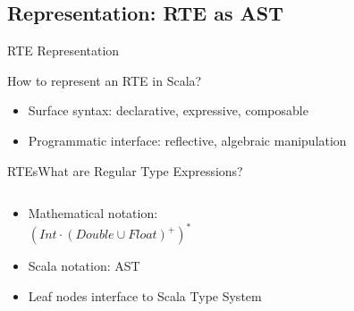 \subsection{Representation: RTE as AST}


{  
\begin{frame}{ RTE Representation}

  How to represent an RTE in Scala?


  \medskip
  
  \begin{itemize}
  \item Surface syntax: declarative, expressive, composable
  \item Programmatic interface: reflective, algebraic manipulation
  \end{itemize}
\end{frame}
}

\newsavebox\exnotebox
\begin{lrbox}{\exnotebox}
  \begin{minipage}{6.5cm}
    
  \end{minipage}
\end{lrbox}


\begin{frame}{RTEs}{What are Regular Type Expressions?}
  \begin{columns}
    \begin{column}{0.55\textwidth}
  \begin{itemize}
  \item Mathematical notation:\\
  \quad\textcolor{greeny}{$(Int \cdot (Double \cup Float)^+)^*$}
  \item Scala notation: AST\\
    \usebox\exnotebox
  \item Leaf nodes interface to Scala Type System
  \end{itemize}
    \end{column}%
    \begin{column}{0.45\textwidth}
      \scalebox{0.7}{}
    \end{column}%
  \end{columns}%
\end{frame}


\newsavebox\exampleAbox
\begin{lrbox}{\exampleAbox}
  \begin{minipage}{12cm}
    
  \end{minipage}
\end{lrbox}



